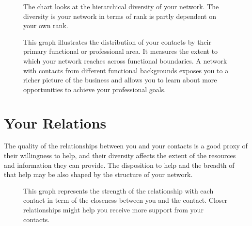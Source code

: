 \documentclass[a4paper,12pt]{article}
\begin{document}
\begin{figure}[H]
\centering
{}
\hspace{.01in}
\caption{The chart looks at the hierarchical diversity of your network. The diversity is your network in terms of rank is partly dependent on your own rank.}
\end{figure}


\begin{figure}[H]
\centering
{}
\hspace{.01in}
\caption{This graph illustrates the distribution of your contacts by their primary functional or professional area. It measures the extent to which your network reaches across functional boundaries. A network with contacts from different functional backgrounds exposes you to a richer picture of the business and allows you to learn about more opportunities to achieve your professional goals.}
\end{figure}


\section{Your Relations}


The quality of the relationships between you and your contacts is a good proxy of their willingness to help, and their diversity affects the extent of the resources and information they can provide. The disposition to help and the breadth of that help may be also shaped by the structure of your network.


\begin{figure}[H]
\centering
{}
\hspace{.01in}
\caption{This graph represents the strength of the relationship with each contact in term of the closeness between you and the contact. Closer relationships might help you receive more support from your contacts.}
\end{figure}
\end{document}
